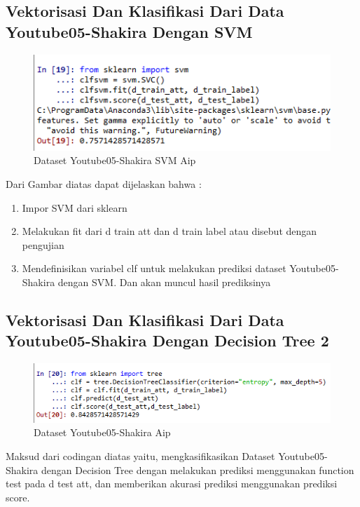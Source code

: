 \subsection{Vektorisasi Dan Klasifikasi Dari Data Youtube05-Shakira Dengan SVM}
\begin{figure}[ht]
\centering
\includegraphics[scale=0.5]{figures/AIP/c8.PNG}
\caption{Dataset Youtube05-Shakira SVM Aip}
\label{Praktek}
\end{figure}
Dari Gambar diatas dapat dijelaskan bahwa :
\begin{enumerate}
\item Impor SVM dari sklearn
\item Melakukan fit dari d train att dan d train label atau disebut dengan pengujian
\item Mendefinisikan variabel clf untuk melakukan prediksi dataset Youtube05-Shakira dengan SVM. Dan akan muncul hasil prediksinya
\end{enumerate}

\subsection{Vektorisasi Dan Klasifikasi Dari Data Youtube05-Shakira Dengan Decision Tree 2}
\begin{figure}[ht]
\centering
\includegraphics[scale=0.5]{figures/AIP/c9.PNG}
\caption{Dataset Youtube05-Shakira Aip}
\label{Praktek}
\end{figure}
Maksud dari codingan diatas yaitu, mengkasifikasikan Dataset Youtube05-Shakira dengan Decision Tree dengan melakukan prediksi menggunakan function test pada d test att, dan memberikan akurasi prediksi menggunakan prediksi score.

